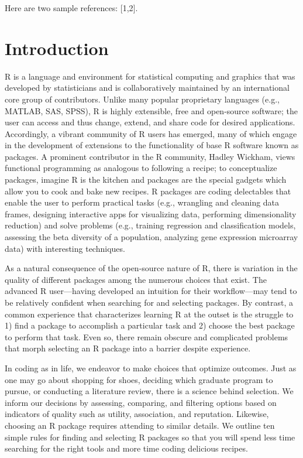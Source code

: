 \documentclass[10pt,letterpaper]{article}
\begin{document}
Here are two sample references: {[}1,2{]}.

\hypertarget{introduction-1}{%
\section{Introduction}\label{introduction-1}}

R is a language and environment for statistical computing and graphics
that was developed by statisticians and is collaboratively maintained by
an international core group of contributors. Unlike many popular
proprietary languages (e.g., MATLAB, SAS, SPSS), R is highly extensible,
free and open-source software; the user can access and thus change,
extend, and share code for desired applications. Accordingly, a vibrant
community of R users has emerged, many of which engage in the
development of extensions to the functionality of base R software known
as packages. A prominent contributor in the R community, Hadley Wickham,
views functional programming as analogous to following a recipe; to
conceptualize packages, imagine R is the kitchen and packages are the
special gadgets which allow you to cook and bake new recipes. R packages
are coding delectables that enable the user to perform practical tasks
(e.g., wrangling and cleaning data frames, designing interactive apps
for visualizing data, performing dimensionality reduction) and solve
problems (e.g., training regression and classification models, assessing
the beta diversity of a population, analyzing gene expression microarray
data) with interesting techniques.

As a natural consequence of the open-source nature of R, there is
variation in the quality of different packages among the numerous
choices that exist. The advanced R user---having developed an intuition
for their workflow---may tend to be relatively confident when searching
for and selecting packages. By contrast, a common experience that
characterizes learning R at the outset is the struggle to 1) find a
package to accomplish a particular task and 2) choose the best package
to perform that task. Even so, there remain obscure and complicated
problems that morph selecting an R package into a barrier despite
experience.

In coding as in life, we endeavor to make choices that optimize
outcomes. Just as one may go about shopping for shoes, deciding which
graduate program to pursue, or conducting a literature review, there is
a science behind selection. We inform our decisions by assessing,
comparing, and filtering options based on indicators of quality such as
utility, association, and reputation. Likewise, choosing an R package
requires attending to similar details. We outline ten simple rules for
finding and selecting R packages so that you will spend less time
searching for the right tools and more time coding delicious recipes.
\end{document}
